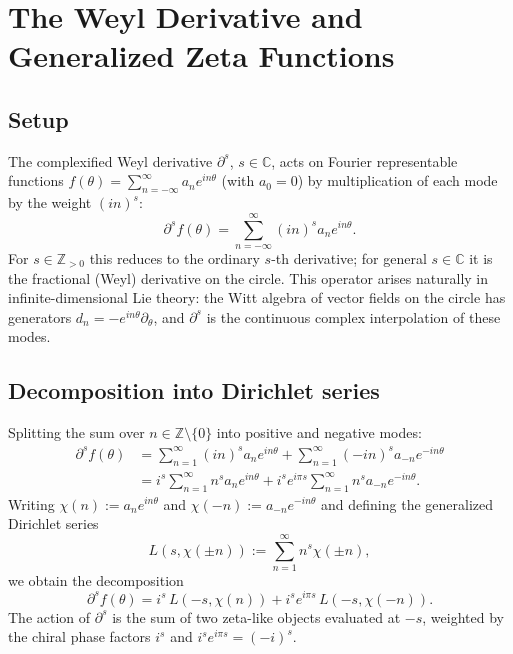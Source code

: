 \documentclass[%
 aip,
 amsmath,amssymb,
 reprint,%
]{revtex4-1}
\theoremstyle{plain}
\theoremstyle{definition}
\newcommand{\C}{\mathbb{C}}
\newcommand{\Z}{\mathbb{Z}}
\begin{document}
\section{The Weyl Derivative and Generalized Zeta Functions}
\label{sec:weyl}

\subsection{Setup}

The complexified Weyl derivative $\partial^s$, $s \in \C$, acts on Fourier
representable functions $f(\theta) = \sum_{n=-\infty}^\infty a_n e^{in\theta}$
(with $a_0 = 0$) by multiplication of each mode by the weight $(in)^s$:
\[
\partial^s f(\theta) = \sum_{n=-\infty}^\infty (in)^s a_n e^{in\theta}.
\]
For $s \in \Z_{>0}$ this reduces to the ordinary $s$-th derivative; for general
$s \in \C$ it is the fractional (Weyl) derivative on the circle.  This operator
arises naturally in infinite-dimensional Lie theory: the Witt algebra
of vector fields on the circle has generators $d_n = -e^{in\theta}\partial_\theta$,
and $\partial^s$ is the continuous complex interpolation of these modes.

\subsection{Decomposition into Dirichlet series}

Splitting the sum over $n \in \Z\setminus\{0\}$ into positive and negative modes:
\begin{align*}
\partial^s f(\theta)
&= \sum_{n=1}^\infty (in)^s a_n e^{in\theta}
 + \sum_{n=1}^\infty (-in)^s a_{-n} e^{-in\theta} \\
&= i^s \sum_{n=1}^\infty n^s a_n e^{in\theta}
 + i^s e^{i\pi s} \sum_{n=1}^\infty n^s a_{-n} e^{-in\theta}.
\end{align*}
Writing $\chi(n) := a_n e^{in\theta}$ and $\chi(-n) := a_{-n}e^{-in\theta}$ and
defining the generalized Dirichlet series
\[
L(s, \chi(\pm n)) := \sum_{n=1}^\infty n^s \chi(\pm n),
\]
we obtain the decomposition
\begin{equation}
\partial^s f(\theta)
= i^s\, L(-s, \chi(n)) + i^s e^{i\pi s}\, L(-s, \chi(-n)).
\label{eq:weyl_decomp}
\end{equation}
The action of $\partial^s$ is the sum of two zeta-like objects evaluated at $-s$,
weighted by the chiral phase factors $i^s$ and $i^s e^{i\pi s} = (-i)^s$.
\end{document}
